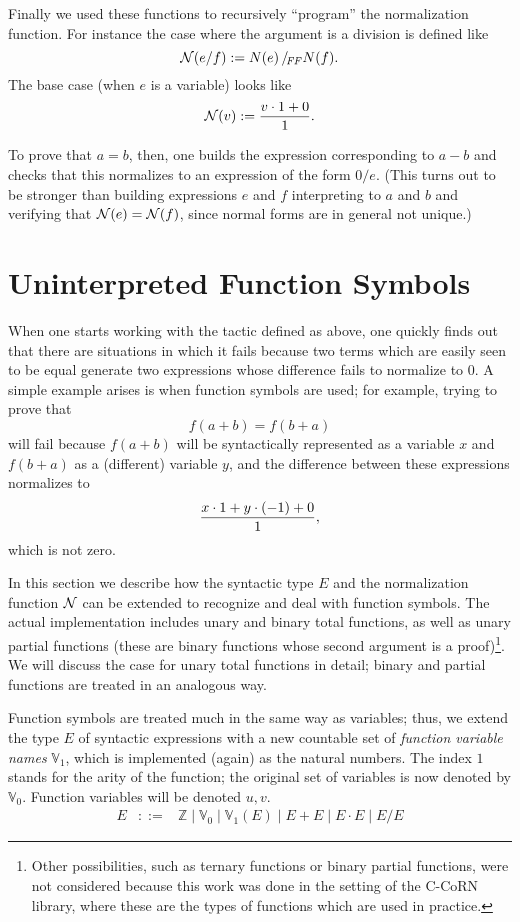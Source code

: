 \documentclass[runningheads]{llncs}
\newcommand{\N}{{\cal N}}
\newcommand{\alt}{\mathrel{|}}
\newcommand{\Z}{{\mathbb Z}}
\newcommand{\V}{{\mathbb V}}
\begin{document}
Finally we used these functions to recursively ``program'' the
normalization function.
For instance the case where the argument is a division is
defined like
$$\N(e/f) := N(e) \,/\!_{\it FF} N(f).$$
\noindent The base case (when $e$ is a variable) looks like
$$\N(v) := {v\cdot 1+0 \over 1}.$$

\noindent
To prove that $a=b$, then, one builds the expression corresponding to
$a-b$ and checks that this normalizes to an expression of the form
$0/e$.
(This turns out to be stronger than building expressions $e$ and $f$
interpreting to $a$ and $b$ and verifying that $\N(e)=\N(f)$, since normal
forms are in general not unique.)

\section{Uninterpreted Function Symbols}\label{functions} %

When one starts working with the tactic defined as above, one quickly
finds out that there are situations in which it fails because two
terms which are easily seen to be equal generate two expressions whose
difference fails to normalize to $0$.
A simple example arises is when function symbols are used; for example,
trying to prove that $$f(a+b)=f(b+a)$$ will fail because $f(a+b)$ will
be syntactically represented as a variable $x$ and $f(b+a)$ as a
(different) variable $y$, and the difference between these expressions
normalizes to $${x\cdot1+y\cdot(-1)+0 \over 1},$$ which is not zero.

In this section we describe how the syntactic type $E$ and the normalization
function $\N$ can be extended to recognize and deal with function symbols.
The actual implementation includes unary and binary total functions,
as well as unary partial functions (these are binary functions whose second
argument is a proof)\footnote{Other possibilities, such as ternary functions
or binary partial functions, were not considered because this work was
done in the setting of the C-CoRN library, where these
are the types of functions which are used in practice.}.
We will discuss the case for unary total functions in detail; binary and
partial functions are treated in an analogous way.

Function symbols are treated much in the same way as variables; thus, we
extend the type $E$ of syntactic expressions with a new countable set of
\emph{function variable names} $\V_1$, which is implemented (again) as the
natural numbers.
The index $1$ stands for the arity of the function; the original set of
variables is now denoted by $\V_0$.
Function variables will be denoted $u,v$.
\begin{eqnarray*}
E &::=& \Z \alt \V_0 \alt \V_1(E) \alt E+E \alt E\cdot E \alt E/E
\end{eqnarray*}
\end{document}
